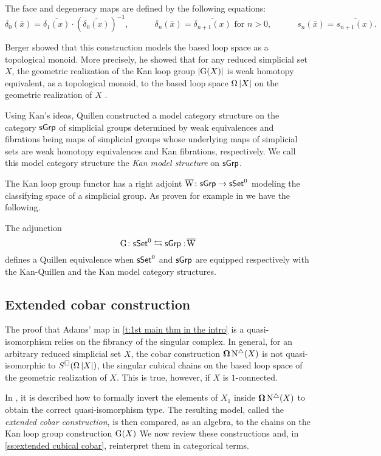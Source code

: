 The face and degeneracy maps are defined by the following equations:
\[
\delta_0(\overline{x}) = \overline{\delta_1(x)} \cdot (\overline{\delta_0(x)})^{-1}, \qquad \quad
\delta_n(\overline{x}) = \overline{\delta_{n+1}(x)} \text{ for } n>0, \qquad \quad
s_n(\overline{x}) = \overline{s_{n+1}(x)}.
\]

Berger showed that this construction models the based loop space as a topological monoid.
More precisely, he showed that for any reduced simplicial set $X$, the geometric realization of the Kan loop group $\vert{\operatorname{G}(X)}\vert$ is weak homotopy equivalent, as a topological monoid, to the based loop space $\operatorname{\Omega} \vert{X}\vert$ on the geometric realization of $X$ \cite{berger1995loops}.

Using Kan's ideas, Quillen constructed a model category structure on the category $\mathsf{sGrp}$ of simplicial groups determined by
weak equivalences and fibrations being maps of simplicial groups whose underlying maps of simplicial sets are weak homotopy equivalences and Kan fibrations, respectively.
We call this model category structure the \textit{Kan model structure} on $\mathsf{sGrp}$.

The Kan loop group functor has a right adjoint $\operatorname{\overline{W}} \colon \mathsf{sGrp} \to \mathsf{sSet}^0$ modeling the classifying space of a simplicial group.
As proven for example in \cite[Chapter V]{goerss2009simplicial} we have the following.

\begin{proposition} \label{p:kan adjuntion}
	The adjunction
	\[
	\operatorname{G} \colon \mathsf{sSet}^0 \leftrightarrows \mathsf{sGrp} :\! \operatorname{\overline{W}}
	\]
	defines a Quillen equivalence when $\mathsf{sSet}^0$ and $\mathsf{sGrp}$ are equipped respectively with the Kan-Quillen and the Kan model category structures.
\end{proposition}

\subsection{Extended cobar construction}

The proof that Adams' map in \cref{t:1st main thm in the intro} is a quasi-isomorphism relies on the fibrancy of the singular complex.
In general, for an arbitrary reduced simplicial set $X$, the cobar construction $\operatorname{\mathbf{\Omega}} \operatorname{N^{\triangle}}(X)$ is not quasi-isomorphic to $S^{\square}(\operatorname{\Omega}|X|)$, the singular cubical chains on the based loop space of the geometric realization of $X$.
This is true, however, if $X$ is $1$-connected.

In \cite{hess2010cobar}, it is described how to formally invert the elements of $X_1$ inside $\operatorname{\mathbf{\Omega}} \operatorname{N^{\triangle}}(X)$ to obtain the correct quasi-isomorphism type.
The resulting model, called the \textit{extended cobar construction}, is then compared, as an algebra, to the chains on the Kan loop group construction $\operatorname{G}(X)$
We now review these constructions and, in \cref{ss:extended cubical cobar}, reinterpret them in categorical terms.

